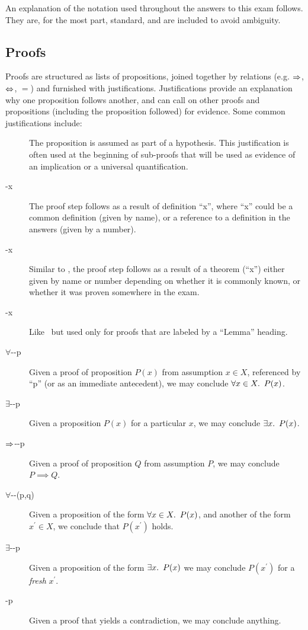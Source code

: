 An explanation of the notation used throughout the answers to this exam follows. They are, for the most part, standard, and are included to avoid ambiguity.

\subsection{Proofs}

Proofs are structured as lists of propositions, joined together by relations (e.g. $\Rightarrow$, $\Leftrightarrow$, $=$) and furnished with justifications. Justifications provide an explanation why one proposition follows another, and can call on other proofs and propositions (including the proposition followed) for evidence. Some common justifications include:
\begin{description}
  \item[\normalfont\Hyp]
    The proposition is assumed as part of a hypothesis. This justification is often used at the beginning of sub-proofs that will be used as evidence of an implication or a universal quantification.
  \item[\normalfont\Def-x]
    The proof step follows as a result of definition ``x'', where ``x'' could be a common definition (given by name), or a reference to a definition in the answers (given by a number).
  \item[\normalfont\Thm-x]
    Similar to \Def, the proof step follows as a result of a theorem (``x'') either given by name or number depending on whether it is commonly known, or whether it was proven somewhere in the exam.
  \item[\normalfont\Lemma-x]
    Like \Thm~but used only for proofs that are labeled by a ``Lemma'' heading.
  \item[\normalfont$\forall$-\Intro-p]
    Given a proof of proposition $P(x)$ from assumption $x\in X$, referenced by ``p'' (or as an immediate antecedent), we may conclude $\forall x\in X\ldotp~P(x)$.
  \item[\normalfont$\exists$-\Intro-p]
    Given a proposition $P(x)$ for a particular $x$, we may conclude $\exists x\ldotp~P(x)$.
  \item[\normalfont$\Rightarrow$-\Intro-p]
    Given a proof of proposition $Q$ from assumption $P$, we may conclude $P\implies Q$.
  \item[\normalfont$\forall$-\Elim-(p,q)]
    Given a proposition of the form $\forall x\in X\ldotp~P(x)$, and another of the form $x^\prime\in X$, we conclude that $P(x^\prime)$ holds.
  \item[\normalfont$\exists$-\Elim-p]
    Given a proposition of the form $\exists x\ldotp~P(x)$ we may conclude $P(x^\prime)$ for a \textit{fresh} $x^\prime$.
  \item[\normalfont\Contra-p]
    Given a proof that yields a contradiction, we may conclude anything.
\end{description}

